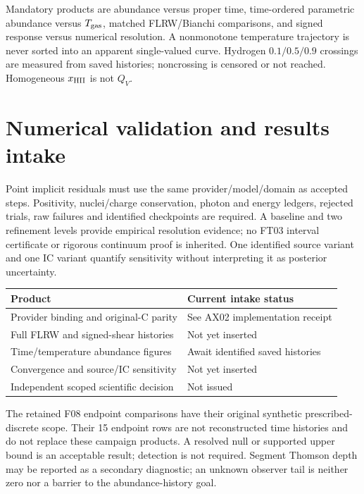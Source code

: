 \documentclass[11pt]{article}
\begin{document}
Mandatory products are abundance versus proper time, time-ordered parametric abundance versus $T_{\rm gas}$, matched FLRW/Bianchi comparisons, and signed response versus numerical resolution. A nonmonotone temperature trajectory is never sorted into an apparent single-valued curve. Hydrogen $0.1/0.5/0.9$ crossings are measured from saved histories; noncrossing is censored or not reached. Homogeneous $x_{\rm HII}$ is not $Q_V$.

\section{Numerical validation and results intake}
Point implicit residuals must use the same provider/model/domain as accepted steps. Positivity, nuclei/charge conservation, photon and energy ledgers, rejected trials, raw failures and identified checkpoints are required. A baseline and two refinement levels provide empirical resolution evidence; no FT03 interval certificate or rigorous continuum proof is inherited. One identified source variant and one IC variant quantify sensitivity without interpreting it as posterior uncertainty.

\begin{center}
\begin{tabular}{ll}\toprule
Product & Current intake status\\\midrule
Provider binding and original-C parity & See AX02 implementation receipt\\
Full FLRW and signed-shear histories & Not yet inserted\\
Time/temperature abundance figures & Await identified saved histories\\
Convergence and source/IC sensitivity & Not yet inserted\\
Independent scoped scientific decision & Not issued\\\bottomrule
\end{tabular}
\end{center}

The retained F08 endpoint comparisons have their original synthetic prescribed-discrete scope. Their 15 endpoint rows are not reconstructed time histories and do not replace these campaign products. A resolved null or supported upper bound is an acceptable result; detection is not required. Segment Thomson depth may be reported as a secondary diagnostic; an unknown observer tail is neither zero nor a barrier to the abundance-history goal.
\end{document}
